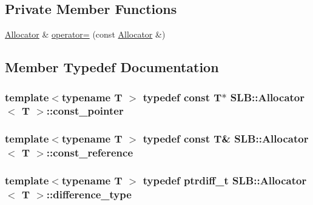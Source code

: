 \subsection*{Private Member Functions}
\begin{DoxyCompactItemize}
\item 
\hyperlink{classSLB_1_1Allocator}{Allocator} \& \hyperlink{classSLB_1_1Allocator_a188616ae28a69c6e3131c4ecf7d49161}{operator=} (const \hyperlink{classSLB_1_1Allocator}{Allocator} \&)
\end{DoxyCompactItemize}


\subsection{Member Typedef Documentation}
\subsubsection[{\texorpdfstring{const\+\_\+pointer}{const_pointer}}]{\setlength{\rightskip}{0pt plus 5cm}template$<$typename T $>$ typedef const T$\ast$ {\bf S\+L\+B\+::\+Allocator}$<$ T $>$\+::{\bf const\+\_\+pointer}}\hypertarget{classSLB_1_1Allocator_afeaf038648f7c641b18ed9e8eac80daf}{}\label{classSLB_1_1Allocator_afeaf038648f7c641b18ed9e8eac80daf}
\subsubsection[{\texorpdfstring{const\+\_\+reference}{const_reference}}]{\setlength{\rightskip}{0pt plus 5cm}template$<$typename T $>$ typedef const T\& {\bf S\+L\+B\+::\+Allocator}$<$ T $>$\+::{\bf const\+\_\+reference}}\hypertarget{classSLB_1_1Allocator_a3160607e8b4d40191536eeecef84b8b2}{}\label{classSLB_1_1Allocator_a3160607e8b4d40191536eeecef84b8b2}
\subsubsection[{\texorpdfstring{difference\+\_\+type}{difference_type}}]{\setlength{\rightskip}{0pt plus 5cm}template$<$typename T $>$ typedef ptrdiff\+\_\+t {\bf S\+L\+B\+::\+Allocator}$<$ T $>$\+::{\bf difference\+\_\+type}}\hypertarget{classSLB_1_1Allocator_af90331221b13541f9b95df3ae4ba03f5}{}\label{classSLB_1_1Allocator_af90331221b13541f9b95df3ae4ba03f5}
